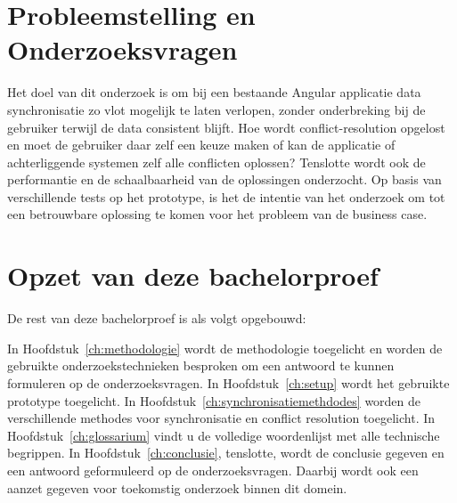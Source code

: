 \section{Probleemstelling en Onderzoeksvragen}
\label{sec:onderzoeksvragen}
Het doel van dit onderzoek is om bij een bestaande Angular applicatie data synchronisatie zo vlot mogelijk te laten verlopen, zonder onderbreking bij de gebruiker terwijl de data consistent blijft. Hoe wordt conflict-resolution opgelost en moet de gebruiker daar zelf een keuze maken of kan de applicatie of achterliggende systemen zelf alle conflicten oplossen? Tenslotte wordt ook de performantie en de schaalbaarheid van de oplossingen onderzocht. Op basis van verschillende tests op het prototype, is het de intentie van het onderzoek om tot een betrouwbare oplossing te komen voor het probleem van de business case.

\section{Opzet van deze bachelorproef}
\label{sec:opzet-bachelorproef}


De rest van deze bachelorproef is als volgt opgebouwd:

In Hoofdstuk~\ref{ch:methodologie} wordt de methodologie toegelicht en worden de gebruikte onderzoekstechnieken besproken om een antwoord te kunnen formuleren op de onderzoeksvragen.
In Hoofdstuk~\ref{ch:setup} wordt het gebruikte prototype toegelicht.
In Hoofdstuk~\ref{ch:synchronisatiemethdodes} worden de verschillende methodes voor synchronisatie en conflict resolution toegelicht.
In Hoofdstuk~\ref{ch:glossarium} vindt u de volledige woordenlijst met alle technische begrippen.
In Hoofdstuk~\ref{ch:conclusie}, tenslotte, wordt de conclusie gegeven en een antwoord geformuleerd op de onderzoeksvragen. Daarbij wordt ook een aanzet gegeven voor toekomstig onderzoek binnen dit domein.

